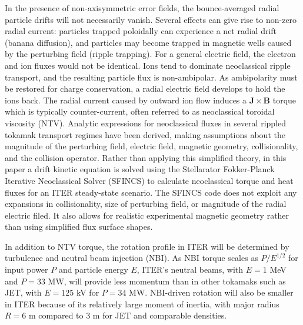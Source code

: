 \documentclass[aip, pop, preprint]{revtex4-1}
\numberwithin{figure}{section}
\numberwithin{equation}{section}
\begin{document}
In the presence of non-axisymmetric error fields, the bounce-averaged radial particle drifts will not necessarily vanish. Several effects can give rise to non-zero radial current: particles trapped poloidally can experience a net radial drift (banana diffusion), and particles may become trapped in magnetic wells caused by the perturbing field (ripple trapping). For a general electric field, the electron and ion fluxes would not be identical. Ions tend to dominate neoclassical ripple transport, and the resulting particle flux is non-ambipolar. As ambipolarity must be restored for charge conservation, a radial electric field develops to hold the ions back. The radial current caused by outward ion flow induces a $\bm{J} \times \bm{B}$ torque which is typically counter-current, often referred to as neoclassical toroidal viscosity (NTV). Analytic expressions for neoclassical fluxes in several rippled tokamak transport regimes have been derived, making assumptions about the magnitude of the perturbing field, electric field, magnetic geometry, collisionality, and the collision operator.\cite{Shaing2003, Shaing2008, Shaing2009, Shaing2010} Rather than applying this simplified theory, in this paper a drift kinetic equation is solved using the Stellarator Fokker-Planck Iterative Neoclassical Solver (SFINCS) \cite{Landreman2014} to calculate neoclassical torque and heat fluxes for an ITER steady-state scenario. The SFINCS code does not exploit any expansions in collisionality, size of perturbing field, or magnitude of the radial electric filed. It also allows for realistic experimental magnetic geometry rather than using simplified flux surface shapes. 

In addition to NTV torque, the rotation profile in ITER will be determined by turbulence and neutral beam injection (NBI). 
As NBI torque scales as $P/E^{1/2}$ for input power $P$ and particle energy $E$, ITER's neutral beams, with $E = 1$ MeV and $P = 33$ MW, will provide less momentum than in other tokamaks such as JET, with $E = 125$ kV for $P = 34$ MW.\cite{Ciric2011} NBI-driven rotation will also be smaller in ITER because of its relatively large moment of inertia, with major radius $R = 6$ m compared to 3 m for JET and comparable densities. 
\end{document}
